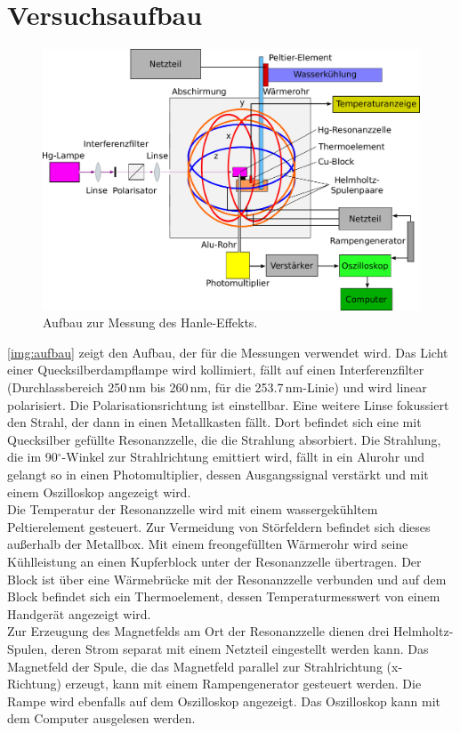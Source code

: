 \section{Versuchsaufbau}

\begin{figure}[H]
\begin{center}
  \includegraphics[width=\textwidth]{../img/aufbau.pdf}
  \caption{Aufbau zur Messung des Hanle-Effekts.}
  \label{img:aufbau}
\end{center}
\end{figure}

\autoref{img:aufbau} zeigt den Aufbau, der für die Messungen verwendet wird.
Das Licht einer Quecksilberdampflampe wird kollimiert,
fällt auf einen Interferenzfilter (Durchlassbereich 250\,nm bis 260\,nm, für die 253.7\,nm-Linie)
und wird linear polarisiert. Die Polarisationsrichtung ist einstellbar.
Eine weitere Linse fokussiert den Strahl,
der dann in einen Metallkasten fällt.
Dort befindet sich eine mit Quecksilber gefüllte Resonanzzelle,
die die Strahlung absorbiert.
Die Strahlung, die im 90$^\circ$-Winkel zur Strahlrichtung emittiert wird,
fällt in ein Alurohr und gelangt so in einen Photomultiplier,
dessen Ausgangssignal verstärkt und mit einem Oszilloskop angezeigt wird.\\
Die Temperatur der Resonanzzelle wird mit einem wassergekühltem Peltierelement gesteuert.
Zur Vermeidung von Störfeldern befindet sich dieses außerhalb der Metallbox.
Mit einem freongefüllten Wärmerohr wird seine Kühlleistung an einen Kupferblock
unter der Resonanzzelle übertragen. Der Block ist über eine Wärmebrücke mit der Resonanzzelle verbunden und
auf dem Block befindet sich ein Thermoelement,
dessen Temperaturmesswert von einem Handgerät angezeigt wird.\\
Zur Erzeugung des Magnetfelds am Ort der Resonanzzelle dienen drei Helmholtz-Spulen,
deren Strom separat mit einem Netzteil eingestellt werden kann.
Das Magnetfeld der Spule, die das Magnetfeld parallel zur Strahlrichtung (x-Richtung) erzeugt,
kann mit einem Rampengenerator gesteuert werden.
Die Rampe wird ebenfalls auf dem Oszilloskop angezeigt.
Das Oszilloskop kann mit dem Computer ausgelesen werden.


